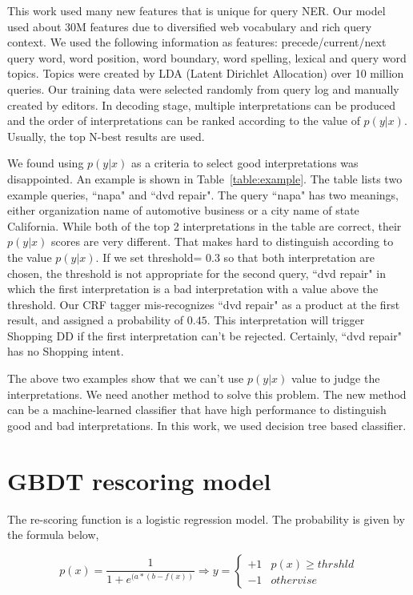 \documentclass{acm_proc_article-sp}
\begin{document}
This work used many new features that is unique for query NER. Our model used about 30M features due to diversified web vocabulary and rich query context. We used the following information as features: precede/current/next query word, word position, word boundary, word spelling, lexical and query word topics. Topics were created by LDA (Latent Dirichlet Allocation) over 10 million queries. Our training data were selected randomly from query log and manually created by editors. 
In decoding stage, multiple interpretations can be produced and the order of interpretations can be ranked according to the value of $p(y|x)$. Usually, the top N-best results are used. 



We found using $p(y|x)$ as a criteria to select good interpretations was disappointed. An example is shown in Table~\ref{table:example}.
The table lists two example queries, ``napa" and ``dvd repair". The query ``napa" has two meanings, either organization name of automotive business or a city name of state California. While both of the top 2 interpretations in the table are correct, their $p(y|x)$ scores are very different. That makes hard to distinguish according to the value $p(y|x)$.
If we set threshold= $0.3$ so that both interpretation are chosen, the threshold is not appropriate for the second query, ``dvd repair" in which the first interpretation is a bad interpretation with a value above the threshold. Our CRF tagger mis-recognizes ``dvd repair" as a product at the first result, and assigned a probability of $0.45$. 
This interpretation will trigger Shopping DD if the first interpretation can't be rejected. Certainly, ``dvd repair" has no Shopping intent.



The above two examples show that we can't use $p(y|x)$ value to judge the interpretations.
We need another method to solve this problem. The new method can be a machine-learned classifier that have high performance to distinguish good and bad interpretations.
In this work, we used decision tree based classifier.


\section{GBDT rescoring model}



The re-scoring function is a logistic regression model. The probability is given by the formula below,

\begin{equation}
p(x) = \frac{1}{1+e^{(a*(b-f(x))}} \Longrightarrow y=\left \{\begin{array}{cc} +1 & p(x)\geqslant thrshld \\ -1 & othervise \end{array}\right.
\label{eq:gbdt}
\end{equation}
\end{document}
